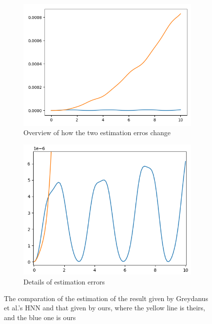 \documentclass{article}
\begin{document}
\begin{figure}[h]
	\centering
	\begin{subfigure}[b]{0.45\linewidth}
		\includegraphics[width=\linewidth]{loss_comp.png}
		\caption{Overview of how the two estimation erros change}
	\end{subfigure}
	\begin{subfigure}[b]{0.45\linewidth}
		\includegraphics[width=\linewidth]{loss_comp2.png}
		\caption{Details of estimation errors}
	\end{subfigure}
	\caption{The comparation of the estimation of the result given by Greydanus et al.'s HNN and that given by ours, where the yellow line is theirs, and the blue one is ours}
	\label{fig:loss_comp}
\end{figure}
\end{document}
